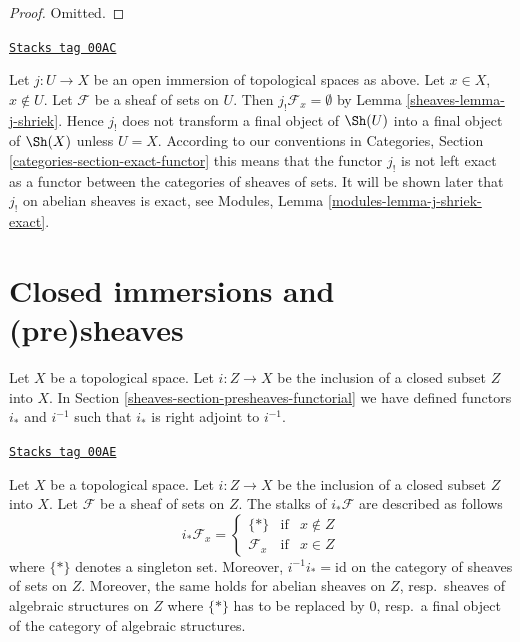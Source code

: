 \begin{proof}
Omitted.
\end{proof}

\begin{remark}
\label{sheaves-remark-j-shriek-not-exact}
\href{https://stacks.math.columbia.edu/tag/00AC}{\texttt{Stacks tag 00AC}}

Let $j : U \to X$ be an open immersion of topological spaces as above.
Let $x \in X$, $x \not \in U$. Let $\mathcal{F}$ be a sheaf of sets
on $U$. Then $j_!\mathcal{F}_x = \emptyset$ by Lemma \ref{sheaves-lemma-j-shriek}.
Hence $j_!$ does not transform a final object of $\Sh(U)$
into a final object of $\Sh(X)$ unless $U = X$.
According to our conventions in
Categories, Section \ref{categories-section-exact-functor}
this means that the functor $j_!$ is not left exact
as a functor between the categories of sheaves of sets.
It will be shown later that $j_!$ on abelian sheaves is exact,
see Modules, Lemma \ref{modules-lemma-j-shriek-exact}.
\end{remark}

\section{Closed immersions and (pre)sheaves}
\label{sheaves-section-closed-immersions}
Let $X$ be a topological space.
Let $i : Z \to X$ be the inclusion of a closed subset $Z$ into $X$.
In Section \ref{sheaves-section-presheaves-functorial} we have defined
functors $i_*$ and $i^{-1}$ such that $i_*$ is right adjoint to
$i^{-1}$.

\begin{lemma}
\label{sheaves-lemma-stalks-closed-pushforward}
\href{https://stacks.math.columbia.edu/tag/00AE}{\texttt{Stacks tag 00AE}}

Let $X$ be a topological space.
Let $i : Z \to X$ be the inclusion of a closed subset $Z$ into $X$.
Let $\mathcal{F}$ be a sheaf of sets on $Z$.
The stalks of $i_*\mathcal{F}$ are described as follows
$$
i_*\mathcal{F}_x =
\left\{
\begin{matrix}
\{*\} & \text{if} & x \not \in Z \\
\mathcal{F}_x & \text{if} & x \in Z
\end{matrix}
\right.
$$
where $\{*\}$ denotes a singleton set. Moreover,
$i^{-1}i_* = \text{id}$ on the category of sheaves
of sets on $Z$. Moreover, the same holds for abelian
sheaves on $Z$, resp.\ sheaves of algebraic structures on $Z$
where $\{*\}$ has to be replaced by $0$, resp.\ a
final object of the category of algebraic structures.
\end{lemma}

